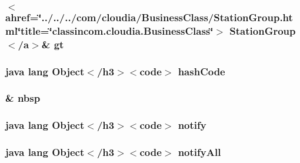 \hypertarget{_cloudia_activity_8html_a972613201c23c386c0171f9864133271}{
\subsubsection[{gt}]{\setlength{\rightskip}{0pt plus 5cm}$<$ahref=\char`\"{}../../../com/cloudia/Business\-Class/Station\-Group.\-html\char`\"{}title=\char`\"{}classincom.\-cloudia.\-Business\-Class\char`\"{}$>$ Station\-Group$<$/{\bf a}$>$\& gt}}\label{_cloudia_activity_8html_a972613201c23c386c0171f9864133271}
\hypertarget{_cloudia_activity_8html_a8e178e2bb2bef055ea23ea3910a221ca}{
\subsubsection[{hash\-Code}]{\setlength{\rightskip}{0pt plus 5cm}java lang Object$<$/h3$>$$<$code$>$ hash\-Code}}\label{_cloudia_activity_8html_a8e178e2bb2bef055ea23ea3910a221ca}
\hypertarget{_cloudia_activity_8html_aef915316f784c9063d942974538301a6}{
\subsubsection[{nbsp}]{\setlength{\rightskip}{0pt plus 5cm}\& nbsp}}\label{_cloudia_activity_8html_aef915316f784c9063d942974538301a6}
\hypertarget{_cloudia_activity_8html_ae99ae10b5010594dbda4794e02db271b}{
\subsubsection[{notify}]{\setlength{\rightskip}{0pt plus 5cm}java lang Object$<$/h3$>$$<$code$>$ notify}}\label{_cloudia_activity_8html_ae99ae10b5010594dbda4794e02db271b}
\hypertarget{_cloudia_activity_8html_a1279357e6e09e33e75b55eb05fdb6436}{
\subsubsection[{notify\-All}]{\setlength{\rightskip}{0pt plus 5cm}java lang Object$<$/h3$>$$<$code$>$ notify\-All}}\label{_cloudia_activity_8html_a1279357e6e09e33e75b55eb05fdb6436}
